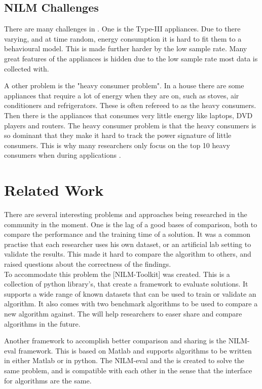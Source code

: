 \subsection{NILM Challenges} 
There are many challenges in . One is the Type-III appliances. Due to there varying, and at time random, energy consumption it is hard to fit them to a behavioural model. This is made further harder by the low sample rate. Many great features of the appliances is hidden due to the low sample rate most data is collected with\citep{RefWorks:17}.

A other problem is the "heavy consumer problem". In a house there are some appliances that require a lot of energy when they are on, such as stoves, air conditioners and refrigerators. These is often refereed to as the heavy consumers. Then there is the appliances that consumes very little energy like laptops, DVD players and routers. The heavy consumer problem is that the heavy consumers is so dominant that they make it hard to track the power signature of little consumers. This is why many researchers only focus on the top 10 heavy consumers when during  applications \citep{RefWorks:21}. 

\section{Related Work} 
\label{sec:RecRelatedwork}

There are several interesting problems and approaches being researched in the  community in the moment. One is the lag of a good bases of comparison, both to compare the performance and the training time of a solution. It was a common practise that each researcher uses his own dataset, or an artificial lab setting to validate the results. This made it hard to compare the algorithm to others, and raised questions about the correctness of the findings. \\
To accommodate this problem the [NILM-Toolkit] was created. This is a collection of python library's, that create a framework to evaluate  solutions. It supports a wide range of known datasets that can be used to train or validate an algorithm. It also comes with two benchmark algorithms to be used to compare a new algorithm against. The  will help researchers to easer share and compare algorithms in the future\citep{RefWorks:21}. 

Another framework to accomplish better comparison and sharing is the NILM-eval framework. This is based on Matlab and supports algorithms to be written in either Matlab or in python. The NILM-eval and the  is created to solve the same problem, and is compatible with each other in the sense that the interface for algorithms are the same\citep{RefWorks:26}. 

